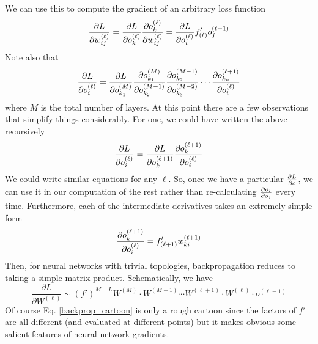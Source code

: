 \documentclass{subfile}
\begin{document}
We can use this to compute the gradient of an arbitrary loss function
\begin{equation}
    \frac{\partial L}{\partial w^{(\ell)}_{ij}} = \frac{\partial L}{\partial o^{(\ell)}_{k}}\frac{\partial o^{(\ell)}_{k}}{\partial w^{(\ell)}_{ij}} = \frac{\partial L}{\partial
o^{(\ell)}_{i}}f^{\prime}_{(\ell)}o_{j}^{(\ell-1)}
\end{equation}
Note also that
\begin{equation}
    \frac{\partial L}{\partial o^{(\ell)}_{i}} = \frac{\partial L}{\partial o^{(M)}_{k_{1}}}\frac{\partial o^{(M)}_{k_{1}}}{\partial o^{(M-1)}_{k_{2}}}\frac{\partial o^{(M-1)}_{k_{2}}}{\partial o^{(M-2)}_{k_{3}}}
    \cdots \frac{\partial o^{(\ell+1)}_{k_{n}}}{\partial o^{(\ell)}_{i}}
\end{equation}
where $M$ is the total number of layers.  At this point there are a few observations that simplify things considerably.  For one, we could have written the
above recursively
\begin{equation}
    \frac{\partial L}{\partial o^{(\ell)}_{i}} = \frac{\partial L}{\partial o^{(\ell+1)}_{k}}\frac{\partial o^{(\ell+1)}_{k}}{\partial o^{(\ell)}_{i}}
\end{equation}
We could write similar equations for any $\ell$.  So, once we have a particular $\frac{\partial L}{\partial o}$, we can use it in our computation of the rest rather than
re-calculating $\frac{\partial o_{i}}{\partial o_{j}}$ every time.  Furthermore, each of the intermediate derivatives takes an extremely simple form
\begin{equation}
    \frac{\partial o^{(\ell+1)}_{k}}{\partial o^{(\ell)}_{i}}  = f^{\prime}_{(\ell+1)}w^{(\ell+1)}_{ki}
\end{equation}
Then, for neural networks with trivial topologies, backpropagation reduces to taking a simple matrix product.  Schematically, we have
\begin{equation}\label{backprop_cartoon}
    \frac{\partial L}{\partial W^{(\ell)}} \sim (f')^{M-L} W^{(M)}\cdot W^{(M-1)}\cdots W^{(\ell+1)}\cdot W^{(\ell)}\cdot o^{(\ell-1)}
\end{equation}
Of course Eq. \ref{backprop_cartoon} is only a rough cartoon since the factors of $f'$ are all different (and evaluated at different points) but it makes
obvious some salient features of neural network gradients.
\end{document}
